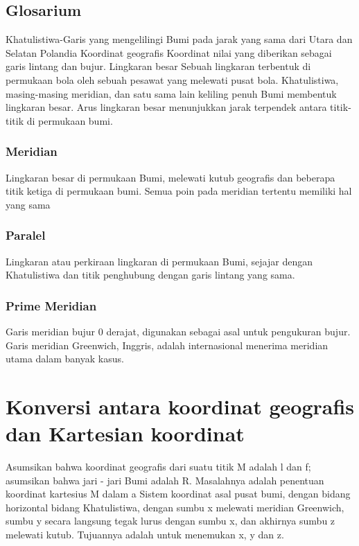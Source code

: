 \subsection{Glosarium}
	Khatulistiwa-Garis yang mengelilingi Bumi pada jarak yang sama dari Utara dan Selatan
	Polandia Koordinat geografis Koordinat nilai yang diberikan sebagai garis lintang dan bujur.
	Lingkaran besar Sebuah lingkaran terbentuk di permukaan bola oleh sebuah pesawat yang melewati
	pusat bola. Khatulistiwa, masing-masing meridian, dan satu sama lain keliling penuh
	Bumi membentuk lingkaran besar. Arus lingkaran besar menunjukkan jarak terpendek antara titik-titik di permukaan bumi.

	\subsubsection{Meridian}
	Lingkaran besar di permukaan Bumi, melewati kutub geografis
	dan beberapa titik ketiga di permukaan bumi. Semua poin pada meridian tertentu memiliki hal yang sama
	\subsubsection{Paralel}
	Lingkaran atau perkiraan lingkaran di permukaan Bumi, sejajar dengan
	Khatulistiwa dan titik penghubung dengan garis lintang yang sama.
	\subsubsection{Prime Meridian}
	Garis meridian bujur 0 derajat, digunakan sebagai asal untuk
	pengukuran bujur. Garis meridian Greenwich, Inggris, adalah internasional
	menerima meridian utama dalam banyak kasus.

\section{Konversi antara koordinat geografis dan Kartesian koordinat}
	Asumsikan bahwa koordinat geografis dari suatu titik M adalah l dan f; asumsikan bahwa jari - jari
	Bumi adalah R. Masalahnya adalah penentuan koordinat kartesius M dalam a
	Sistem koordinat asal pusat bumi, dengan bidang horizontal bidang
	Khatulistiwa, dengan sumbu x melewati meridian Greenwich, sumbu y secara langsung
	tegak lurus dengan sumbu x, dan akhirnya sumbu z melewati kutub.
	Tujuannya adalah untuk menemukan x, y dan z.

